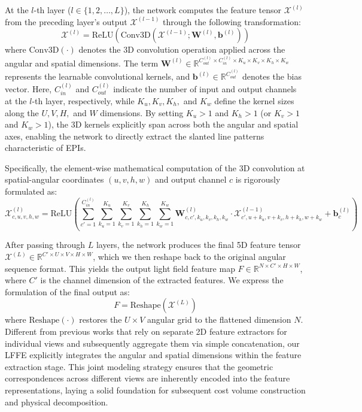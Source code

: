 \documentclass[lettersize,journal]{IEEEtran}
\begin{document}
At the $l$-th layer ($l \in \{1, 2, \dots, L\}$), the network computes the feature tensor $\mathcal{X}^{(l)}$ from the preceding layer's output $\mathcal{X}^{(l-1)}$ through the following transformation:
\begin{equation}
\label{eq:eq1}
\mathcal{X}^{(l)} = \text{ReLU}\left( \text{Conv3D}\left(\mathcal{X}^{(l-1)}; \mathbf{W}^{(l)}, \mathbf{b}^{(l)}\right) \right)
\end{equation}
where $\text{Conv3D}(\cdot)$ denotes the 3D convolution operation applied across the angular and spatial dimensions. The term $\mathbf{W}^{(l)} \in \mathbb{R}^{C_{out}^{(l)} \times C_{in}^{(l)} \times K_u \times K_v \times K_h \times K_w}$ represents the learnable convolutional kernels, and $\mathbf{b}^{(l)} \in \mathbb{R}^{C_{out}^{(l)}}$ denotes the bias vector. Here, $C_{in}^{(l)}$ and $C_{out}^{(l)}$ indicate the number of input and output channels at the $l$-th layer, respectively, while $K_u, K_v, K_h,$ and $K_w$ define the kernel sizes along the $U, V, H,$ and $W$ dimensions. By setting $K_u > 1$ and $K_h > 1$ (or $K_v > 1$ and $K_w > 1$), the 3D kernels explicitly span across both the angular and spatial axes, enabling the network to directly extract the slanted line patterns characteristic of EPIs.

Specifically, the element-wise mathematical computation of the 3D convolution at spatial-angular coordinates $(u, v, h, w)$ and output channel $c$ is rigorously formulated as:
\begin{equation}
\label{eq:eq2}
\mathcal{X}^{(l)}_{c, u, v, h, w} = \text{ReLU} \left( \sum_{c'=1}^{C_{in}^{(l)}} \sum_{k_u=1}^{K_u} \sum_{k_v=1}^{K_v} \sum_{k_h=1}^{K_h} \sum_{k_w=1}^{K_w} \mathbf{W}^{(l)}_{c, c', k_u, k_v, k_h, k_w} \cdot \mathcal{X}^{(l-1)}_{c', u+k_u, v+k_v, h+k_h, w+k_w} + \mathbf{b}^{(l)}_c \right)
\end{equation}

After passing through $L$ layers, the network produces the final 5D feature tensor $\mathcal{X}^{(L)} \in \mathbb{R}^{C' \times U \times V \times H \times W}$, which we then reshape back to the original angular sequence format. This yields the output light field feature map $F \in \mathbb{R}^{N \times C' \times H \times W}$, where $C'$ is the channel dimension of the extracted features. We express the formulation of the final output as:
\begin{equation}
\label{eq:eq3}
F = \text{Reshape}\left( \mathcal{X}^{(L)} \right)
\end{equation}
where $\text{Reshape}(\cdot)$ restores the $U \times V$ angular grid to the flattened dimension $N$. Different from previous works that rely on separate 2D feature extractors for individual views and subsequently aggregate them via simple concatenation, our LFFE explicitly integrates the angular and spatial dimensions within the feature extraction stage. This joint modeling strategy ensures that the geometric correspondences across different views are inherently encoded into the feature representations, laying a solid foundation for subsequent cost volume construction and physical decomposition.
\end{document}
